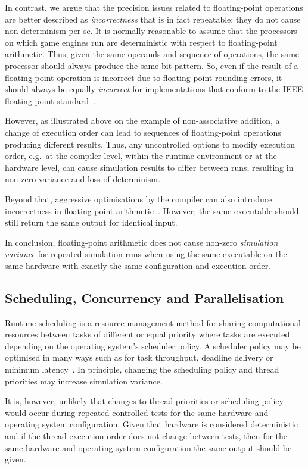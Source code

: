 In contrast, we argue that the precision issues related to floating-point operations are better described as \textit{incorrectness} that is in fact repeatable; they do not cause non-determinism per se. 
%
It is normally reasonable to assume that the processors on which game engines run are deterministic with respect to floating-point arithmetic. 
%
Thus, given the same operands and sequence of operations, the same processor should always produce the same bit pattern. 
%
So, even if the result of a floating-point operation is incorrect due to floating-point rounding errors, it should always be equally \textit{incorrect} for implementations that conform to the IEEE floating-point standard~\cite{8766229}.

However, as illustrated above on the example of non-associative addition, a change of execution order can lead to sequences of floating-point operations producing different results. Thus, any uncontrolled options to modify execution order, e.g.\ at the compiler level, within the runtime environment or at the hardware level, can cause simulation results to differ between runs, resulting in non-zero variance and loss of determinism. 
 
Beyond that, aggressive optimisations by the compiler can also introduce incorrectness in floating-point arithmetic~\cite{llvm-floating-point}. However, the same executable should still return the same output for identical input. 

In conclusion, floating-point arithmetic does not cause non-zero \textit{simulation variance} for repeated simulation runs when using the same executable on the same hardware with exactly the same configuration and execution order.




\subsection{Scheduling, Concurrency and Parallelisation}
Runtime scheduling is a resource management method for sharing computational resources between tasks of different or equal priority where tasks are executed depending on the operating system's scheduler policy. A scheduler policy may be optimised in many ways such as for task throughput, deadline delivery or minimum latency~\cite{liu1973scheduling}. 
%
In principle, changing the scheduling policy and thread priorities may increase simulation variance. 

It is, however, unlikely that changes to thread priorities or scheduling policy would occur during repeated controlled tests for the same hardware and operating system configuration. Given that hardware is considered deterministic and if the thread execution order does not change between tests, then for the same hardware and operating system configuration the same output should be given.  

